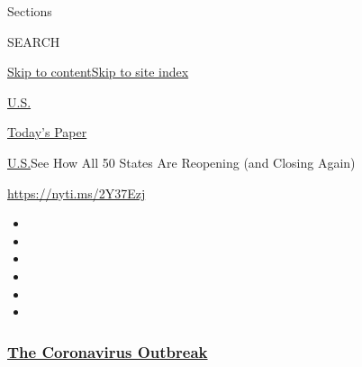 Sections

SEARCH

\protect\hyperlink{site-content}{Skip to
content}\protect\hyperlink{site-index}{Skip to site index}

\href{https://www.nytimes3xbfgragh.onion/section/us}{U.S.}

\href{https://myaccount.nytimes3xbfgragh.onion/auth/login?response_type=cookie\&client_id=vi}{}

\href{https://www.nytimes3xbfgragh.onion/section/todayspaper}{Today's
Paper}

\href{/section/us}{U.S.}\textbar{}See How All 50 States Are Reopening
(and Closing Again)

\url{https://nyti.ms/2Y37Ezj}

\begin{itemize}
\item
\item
\item
\item
\item
\item
\end{itemize}

\hypertarget{the-coronavirus-outbreak}{%
\subsubsection{\texorpdfstring{\href{https://www.nytimes3xbfgragh.onion/news-event/coronavirus?name=styln-coronavirus-national\&region=TOP_BANNER\&variant=undefined\&block=storyline_menu_recirc\&action=click\&pgtype=Interactive\&impression_id=772e6200-e387-11ea-a6c1-6f7a25730905}{The
Coronavirus
Outbreak}}{The Coronavirus Outbreak}}\label{the-coronavirus-outbreak}}


